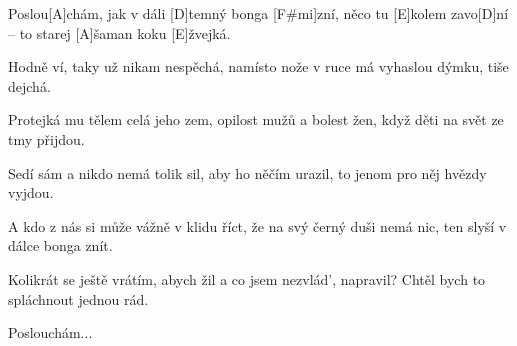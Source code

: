 
\sloka
Poslou[A]chám, jak v dáli [D]temný bonga [F#mi]zní,
něco tu [E]kolem zavo[D]ní –
to starej [A]šaman koku [E]žvejká.

\sloka
Hodně ví, taky už nikam nespěchá,
namísto nože v ruce má
vyhaslou dýmku, tiše dejchá.

\sloka
Protejká mu tělem celá jeho zem,
opilost mužů a bolest žen,
když děti na svět ze tmy přijdou.

\sloka
Sedí sám a nikdo nemá tolik sil,
aby ho něčím urazil,
to jenom pro něj hvězdy vyjdou.

\sloka
A kdo z nás si může vážně v klidu říct,
že na svý černý duši nemá nic,
ten slyší v dálce bonga znít.

\sloka
Kolikrát se ještě vrátím, abych žil
a co jsem nezvlád', napravil?
Chtěl bych to spláchnout jednou rád.

\sloka
Poslouchám...

